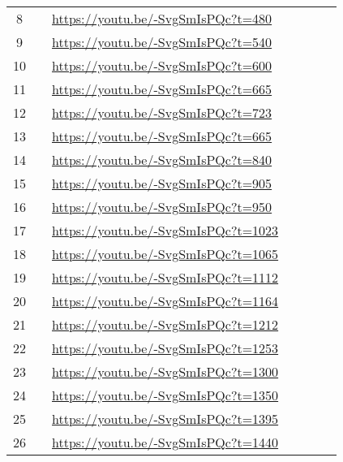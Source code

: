 \begin{longtable*}[]{ccp{2.0cm} p{5.0cm} p{5.0cm} p{5.0cm} p{5.0cm}}
8 &  & \url{https://youtu.be/-SvgSmIsPQc?t=480} \\
9 &  & \url{https://youtu.be/-SvgSmIsPQc?t=540} \\ 
10 &  & \url{https://youtu.be/-SvgSmIsPQc?t=600} \\
11 &  & \url{https://youtu.be/-SvgSmIsPQc?t=665} \\
12 &  & \url{https://youtu.be/-SvgSmIsPQc?t=723} \\
13 &  & \url{https://youtu.be/-SvgSmIsPQc?t=665} \\
14 &  & \url{https://youtu.be/-SvgSmIsPQc?t=840} \\
15 &  & \url{https://youtu.be/-SvgSmIsPQc?t=905} \\
16 &  & \url{https://youtu.be/-SvgSmIsPQc?t=950} \\
17 &  & \url{https://youtu.be/-SvgSmIsPQc?t=1023} \\
18 &  & \url{https://youtu.be/-SvgSmIsPQc?t=1065} \\
19 &  & \url{https://youtu.be/-SvgSmIsPQc?t=1112} \\
20 &  & \url{https://youtu.be/-SvgSmIsPQc?t=1164} \\
21 &  & \url{https://youtu.be/-SvgSmIsPQc?t=1212} \\
22 &  & \url{https://youtu.be/-SvgSmIsPQc?t=1253} \\
23 &  & \url{https://youtu.be/-SvgSmIsPQc?t=1300} \\
24 &  & \url{https://youtu.be/-SvgSmIsPQc?t=1350} \\
25 &  & \url{https://youtu.be/-SvgSmIsPQc?t=1395} \\
26 &  & \url{https://youtu.be/-SvgSmIsPQc?t=1440} \\

\end{longtable*}
